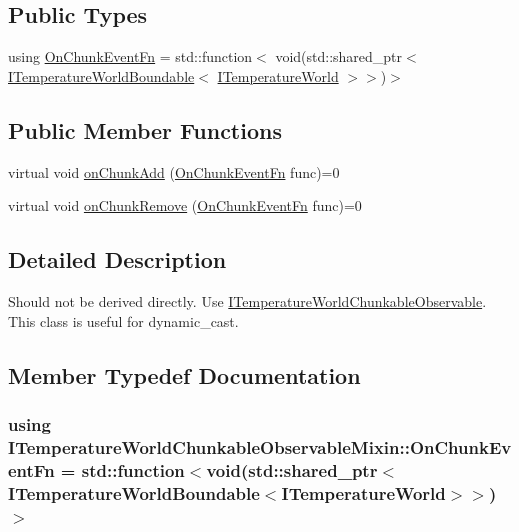 \subsection*{Public Types}
\begin{DoxyCompactItemize}
\item 
using \hyperlink{class_i_temperature_world_chunkable_observable_mixin_a777c50f4a4ca0b3f7cd6bc02b87bb883}{On\-Chunk\-Event\-Fn} = std\-::function$<$ void(std\-::shared\-\_\-ptr$<$ \hyperlink{class_i_temperature_world_boundable}{I\-Temperature\-World\-Boundable}$<$ \hyperlink{class_i_temperature_world}{I\-Temperature\-World} $>$$>$)$>$
\end{DoxyCompactItemize}
\subsection*{Public Member Functions}
\begin{DoxyCompactItemize}
\item 
virtual void \hyperlink{class_i_temperature_world_chunkable_observable_mixin_a5bafba4f885aa5ae4cab3133d75d45d1}{on\-Chunk\-Add} (\hyperlink{class_i_temperature_world_chunkable_observable_mixin_a777c50f4a4ca0b3f7cd6bc02b87bb883}{On\-Chunk\-Event\-Fn} func)=0
\item 
virtual void \hyperlink{class_i_temperature_world_chunkable_observable_mixin_a85cfb47d07c70183d1c4da81a91da599}{on\-Chunk\-Remove} (\hyperlink{class_i_temperature_world_chunkable_observable_mixin_a777c50f4a4ca0b3f7cd6bc02b87bb883}{On\-Chunk\-Event\-Fn} func)=0
\end{DoxyCompactItemize}


\subsection{Detailed Description}
Should not be derived directly. Use {\ttfamily \hyperlink{class_i_temperature_world_chunkable_observable}{I\-Temperature\-World\-Chunkable\-Observable}}. This class is useful for {\ttfamily dynamic\-\_\-cast}. 

\subsection{Member Typedef Documentation}
\hypertarget{class_i_temperature_world_chunkable_observable_mixin_a777c50f4a4ca0b3f7cd6bc02b87bb883}{
\subsubsection[{On\-Chunk\-Event\-Fn}]{\setlength{\rightskip}{0pt plus 5cm}using {\bf I\-Temperature\-World\-Chunkable\-Observable\-Mixin\-::\-On\-Chunk\-Event\-Fn} =  std\-::function$<$void(std\-::shared\-\_\-ptr$<${\bf I\-Temperature\-World\-Boundable}$<${\bf I\-Temperature\-World}$>$$>$)$>$}}\label{class_i_temperature_world_chunkable_observable_mixin_a777c50f4a4ca0b3f7cd6bc02b87bb883}


